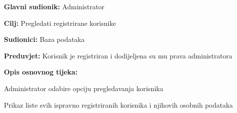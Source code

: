 					\noindent {}
					\begin{packed_item}
	
						\item \textbf{Glavni sudionik: }  Administrator
						\item  \textbf{Cilj:} Pregledati registrirane korisnike
						\item  \textbf{Sudionici:} Baza podataka
						\item  \textbf{Preduvjet:} Korisnik je registriran i dodijeljena su mu prava administratora
						\item  \textbf{Opis osnovnog tijeka:} 
						
						
						\item[] \begin{packed_enum}
	
							\item Administrator odabire opciju pregledavanja korisnika 						
							\item Prikaz liste svih ispravno registriranih korisnika i njihovih osobnih podataka
							
						\end{packed_enum}
					\end{packed_item}
					\noindent {}
